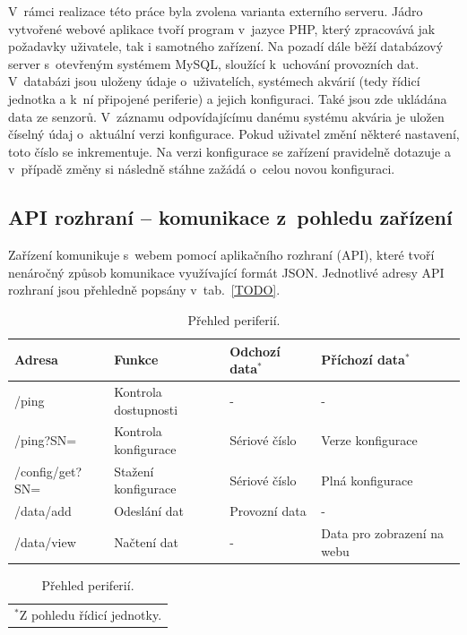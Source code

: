     V~rámci realizace této práce byla zvolena varianta externího serveru. Jádro vytvořené webové aplikace tvoří program v~jazyce PHP, který zpracovává jak požadavky uživatele, tak i samotného zařízení. Na pozadí dále běží databázový server s~otevřeným systémem MySQL, sloužící k~uchování provozních dat. V~databázi jsou uloženy údaje o~uživatelích, systémech akvárií (tedy řídicí jednotka a k~ní připojené periferie) a jejich konfiguraci. Také jsou zde ukládána data ze senzorů. V~záznamu odpovídajícímu danému systému akvária je uložen číselný údaj o~aktuální verzi konfigurace. Pokud uživatel změní některé nastavení, toto číslo se inkrementuje. Na verzi konfigurace se zařízení pravidelně dotazuje a v~případě změny si následně stáhne zažádá o~celou novou konfiguraci.

    \subsection{API rozhraní -- komunikace z~pohledu zařízení}
    Zařízení komunikuje s~webem pomocí aplikačního rozhraní (API), které tvoří nenáročný způsob komunikace využívající formát JSON. Jednotlivé adresy API rozhraní jsou přehledně popsány v~tab.~\ref{TODO}. 

    \begin{table}[h]
        \centering
        \caption{Přehled periferií.}
        \label{tab:prehled-periferii}
        \begin{tabular}{|l|l|l|l|}
            \hline
            Adresa & Funkce & Odchozí data\(^{*}\)  & Příchozí data\(^{*}\)  \\ \hline\hline
           
            /ping & Kontrola dostupnosti & - & -  \\ \hline
            /ping?SN= & Kontrola konfigurace & Sériové číslo & Verze konfigurace  \\ \hline
            /config/get?SN= & Stažení konfigurace & Sériové číslo & Plná konfigurace  \\ \hline
            /data/add & Odeslání dat & Provozní data & -  \\ \hline
            /data/view & Načtení dat & - & Data pro zobrazení na webu  \\ \hline
            \end{tabular}
            \begin{tabular}{c}
                \(^{*}\)Z pohledu  řídicí jednotky.
            \end{tabular}   
    \end{table}

